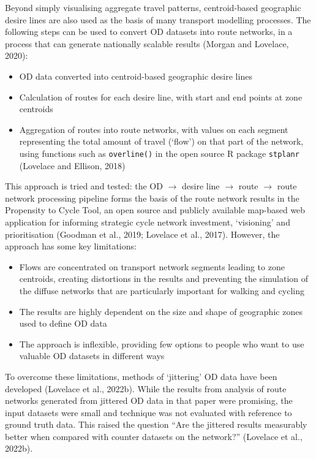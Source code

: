 \documentclass{isprs} %
\begin{document}
Beyond simply visualising aggregate travel patterns, centroid-based geographic desire lines are also used as the basis of many transport modelling processes.
The following steps can be used to convert OD datasets into route networks, in a process that can generate nationally scalable results (Morgan and Lovelace, 2020):

\begin{itemize}
\item
  OD data converted into centroid-based geographic desire lines
\item
  Calculation of routes for each desire line, with start and end points at zone centroids
\item
  Aggregation of routes into route networks, with values on each segment representing the total amount of travel (`flow') on that part of the network, using functions such as \texttt{overline()} in the open source R package \texttt{stplanr} (Lovelace and Ellison, 2018)
\end{itemize}

This approach is tried and tested:
the OD \(\rightarrow\) desire line \(\rightarrow\) route \(\rightarrow\) route network processing pipeline forms the basis of the route network results in the Propensity to Cycle Tool, an open source and publicly available map-based web application for informing strategic cycle network investment, `visioning' and prioritisation (Goodman et al., 2019; Lovelace et al., 2017).
However, the approach has some key limitations:

\begin{itemize}
\item
  Flows are concentrated on transport network segments leading to zone centroids, creating distortions in the results and preventing the simulation of the diffuse networks that are particularly important for walking and cycling
\item
  The results are highly dependent on the size and shape of geographic zones used to define OD data
\item
  The approach is inflexible, providing few options to people who want to use valuable OD datasets in different ways
\end{itemize}

To overcome these limitations, methods of `jittering' OD data have been developed (Lovelace et al., 2022b).
While the results from analysis of route networks generated from jittered OD data in that paper were promising, the input datasets were small and technique was not evaluated with reference to ground truth data.
This raised the question ``Are the jittered results measurably better when compared with counter datasets on the network?'' (Lovelace et al., 2022b).
\end{document}
